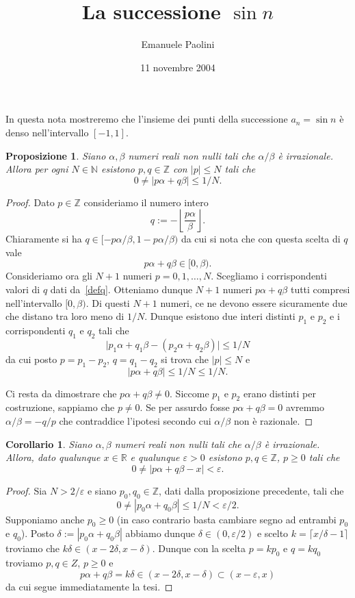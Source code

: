 \documentclass[italian,a4paper]{article}
\title{La successione $\sin n$}
\author{Emanuele Paolini}
\date{11 novembre 2004}
\newcommand{\R}{\mathbb{R}}
\newcommand{\N}{\mathbb{N}}
\newcommand{\Z}{\mathbb{Z}}
\renewcommand{\epsilon}{\varepsilon}
\newtheorem{proposition}[theorem]{Proposizione}
\newtheorem{corollary}[theorem]{Corollario}
\begin{document}
\maketitle
In questa nota mostreremo che l'insieme dei punti della successione $a_n=\sin n$ \`e denso nell'intervallo $[-1,1]$.

\begin{proposition}
Siano $\alpha,\beta$ numeri reali non nulli tali che $\alpha/\beta$
\`e irrazionale. Allora per ogni $N\in\N$ esistono $p,q\in\Z$ con
$|p|\le N$ tali che
\[
  0 \neq |p\alpha + q\beta| \le 1/N.
\]  
\end{proposition}
\begin{proof}
Dato $p\in \Z$ consideriamo il numero intero
\begin{equation}\label{defq}
   q := -\left\lfloor\frac{p\alpha}\beta\right\rfloor.
\end{equation}
Chiaramente si ha $q\in[-p\alpha/\beta,1-p\alpha/\beta)$ da cui si
nota che con questa scelta di $q$ vale
\[
p\alpha + q\beta \in [0,\beta).
\]
Consideriamo ora gli $N+1$ numeri
$p=0,1,\ldots,N$. Scegliamo i corrispondenti valori di $q$ dati
da~\eqref{defq}.
Otteniamo dunque $N+1$ numeri $p\alpha + q\beta$ tutti compresi
nell'intervallo $[0,\beta)$. 
Di questi $N+1$ numeri, ce ne devono essere sicuramente due che
distano tra loro meno di $1/N$. Dunque esistono due interi distinti
$p_1$ e $p_2$ e i corrispondenti $q_1$ e $q_2$ tali che
\[
  \lvert p_1\alpha+q_1\beta - (p_2\alpha + q_2\beta)\rvert \le 1/N
\]
da cui posto $p=p_1-p_2$, $q=q_1-q_2$ si trova che $|p|\le N$ e 
\[
  \lvert p\alpha + q\beta\rvert \le 1/N \le 1/N.
\]

Ci resta da dimostrare che $p\alpha + q\beta \neq 0$. Siccome $p_1$ e
$p_2$ erano distinti per costruzione, sappiamo che $p\neq 0$. Se per
assurdo fosse $p\alpha+q\beta =0 $ avremmo $\alpha/\beta=-q/p$ che
contraddice l'ipotesi secondo cui $\alpha/\beta$ non \`e razionale.
\end{proof}
\begin{corollary}
Siano $\alpha,\beta$ numeri reali non nulli tali che $\alpha/\beta$
\`e irrazionale. Allora, dato qualunque $x\in\R$ e qualunque
$\epsilon>0$ esistono $p,q\in \Z$, $p\ge 0$ tali che 
\[
  0\neq \lvert p\alpha+q\beta - x\rvert < \epsilon.
\]
\end{corollary}
\begin{proof}
Sia $N>2/\epsilon$ e siano $p_0,q_0\in \Z$, 
dati dalla proposizione precedente, tali che
\[
  0\neq |p_0 \alpha + q_0\beta| \le 1/N < \epsilon/2.
\]
Supponiamo anche $p_0\ge 0$ (in caso contrario basta cambiare segno ad
entrambi $p_0$ e $q_0$).
Posto $\delta:= |p_0 \alpha + q_0\beta|$ abbiamo dunque
$\delta\in(0,\epsilon/2)$ e scelto $k=\lceil x/\delta -1\rceil$ troviamo
che $k\delta\in(x-2\delta,x-\delta)$. Dunque con la scelta $p=kp_0$ e
$q=kq_0$ troviamo $p,q\in Z$, $p\ge 0$ e 
\[
  p\alpha + q\beta = k\delta \in (x-2\delta,x-\delta)\subset (x-\epsilon,x)
\]
da cui segue immediatamente la tesi.
\end{proof}
\end{document}
